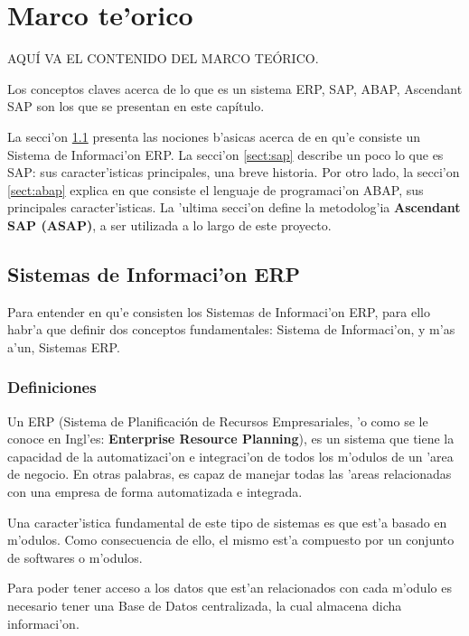 \chapter{Marco te'orico} \label{chap:ssimilar}

AQU\'I VA EL CONTENIDO DEL MARCO TE\'ORICO.
\vspace{5 mm}

Los conceptos claves acerca de lo que es un sistema ERP, SAP, ABAP, Ascendant SAP son los que se presentan en este capítulo.

La secci'on \ref{sect:erp} presenta las nociones b'asicas acerca de en qu'e consiste un Sistema de Informaci'on ERP. La secci'on 
\ref{sect:sap} describe un poco lo que es SAP: sus caracter'isticas principales, una  breve historia. Por otro lado, la secci'on \ref{sect:abap} explica en que consiste el lenguaje de programaci'on ABAP, sus principales caracter'isticas. La 'ultima secci'on define la metodolog'ia \textbf{Ascendant SAP (ASAP)}, a ser utilizada a lo largo de este proyecto.

\section{Sistemas de Informaci'on ERP} \label{sect:erp}

Para entender en qu'e consisten los Sistemas de Informaci'on ERP, para ello habr'a que definir dos conceptos fundamentales: Sistema de Informaci'on, y m'as a'un, Sistemas ERP. 

\subsection{Definiciones} \label{subsect:defprop}

\begin{definicion} \label{def:sisinfo}

\end{definicion}

\begin{definicion} \label{def:siserp}
Un ERP (Sistema de Planificación de Recursos Empresariales, 'o como se le conoce en Ingl'es: \textbf{Enterprise Resource Planning}), es un sistema que tiene la capacidad de la automatizaci'on e integraci'on de todos los m'odulos de un 'area de negocio. En otras palabras, es capaz de manejar todas las 'areas relacionadas con una empresa de forma automatizada e integrada. 

Una caracter'istica fundamental de este tipo de sistemas es que est'a basado en m'odulos. Como consecuencia de ello, el mismo est'a compuesto por un conjunto de softwares o m'odulos. 

Para poder tener acceso a los datos que est'an relacionados con cada m'odulo es necesario tener una Base de Datos centralizada, la cual almacena dicha informaci'on. 
\end{definicion}

